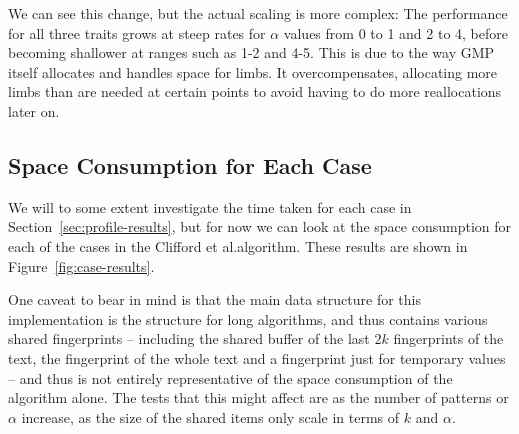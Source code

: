 \documentclass[ %
                    author={Dominic Joseph Moylett},
                    degree={MEng},
                     title={Dictionary Matching with Fingerprints},
                  subtitle={An Empirical Analysis},
                      type={research},
                      year={2015} ]{dissertation}
\begin{document}
We can see this change, but the actual scaling is more complex: The performance for all three traits grows at steep rates for $\alpha$ values from 0 to 1 and 2 to 4, before becoming shallower at ranges such as 1-2 and 4-5. This is due to the way GMP itself allocates and handles space for limbs. It overcompensates, allocating more limbs than are needed at certain points to avoid having to do more reallocations later on.

\subsection{Space Consumption for Each Case}
\label{ssec:case-size}

We will to some extent investigate the time taken for each case in Section~\ref{sec:profile-results}, but for now we can look at the space consumption for each of the cases in the Clifford et al.\@ algorithm. These results are shown in Figure~\ref{fig:case-results}.

One caveat to bear in mind is that the main data structure for this implementation is the structure for long algorithms, and thus contains various shared fingerprints -- including the shared buffer of the last $2k$ fingerprints of the text, the fingerprint of the whole text and a fingerprint just for temporary values -- and thus is not entirely representative of the space consumption of the algorithm alone. The tests that this might affect are as the number of patterns or $\alpha$ increase, as the size of the shared items only scale in terms of $k$ and $\alpha$.
\end{document}
